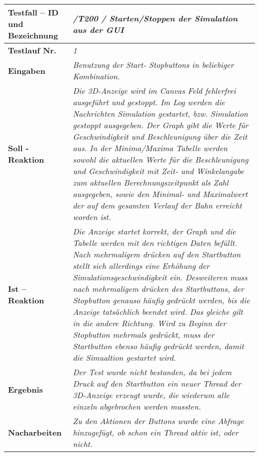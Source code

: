 \begin{longtable}{|p{7cm}|p{10cm}|}
\hline
\textbf{Testfall -- ID und Bezeichnung} & \textit{ /T200 / Starten/Stoppen der Simulation aus der GUI} \\
\hline
\textbf{Testlauf Nr.} & \textit{1} \\
\hline
\textbf{Eingaben} & \textit{Benutzung der Start- Stopbuttons in beliebiger Kombination.} \\
\hline
\textbf{Soll - Reaktion} & \textit{Die 3D-Anzeige wird im Canvas Feld fehlerfrei ausgeführt und gestoppt. Im Log werden die Nachrichten Simulation gestartet, bzw. Simulation gestoppt ausgegeben.
Der Graph gibt die Werte für Geschwindigkeit und Beschleunigung über die Zeit aus. In der Minima/Maxima Tabelle werden sowohl die aktuellen Werte für die Beschleunigung und Geschwindigkeit mit 
Zeit- und Winkelangabe zum aktuellen Berechnungszeitpunkt als Zahl ausgegeben, sowie den Minimal- und Maximalwert der auf dem gesamten Verlauf der Bahn erreicht worden ist.
} \\
\hline
\textbf{Ist -- Reaktion} & \textit{Die Anzeige startet korrekt, der Graph und die Tabelle werden mit den richtigen Daten befüllt. Nach mehrmaligem drücken auf den Startbutton stellt sich allerdings 
eine Erhöhung der Simulationsgeschwindigkeit ein. Desweiteren muss nach mehrmaligem drücken des Startbuttons, der Stopbutton genauso häufig gedrückt werden, bis die Anzeige tatsächlich beendet wird.
Das gleiche gilt in die andere Richtung. Wird zu Beginn der Stopbutton mehrmals gedrückt, muss der Startbutton ebenso häufig gedrückt werden, damit die Simualtion gestartet wird.} \\
\hline
\textbf{Ergebnis} & \textit{Der Test wurde nicht bestanden, da bei jedem Druck auf den Startbutton ein neuer Thread der 3D-Anzeige erzeugt wurde, die wiederum alle einzeln abgebrochen werden mussten.} \\
\hline
\textbf{Nacharbeiten } & \textit{Zu den Aktionen der Buttons wurde eine Abfrage hinzugefügt, ob schon ein Thread aktiv ist, oder nicht.} \\
\hline
 \end{longtable}



